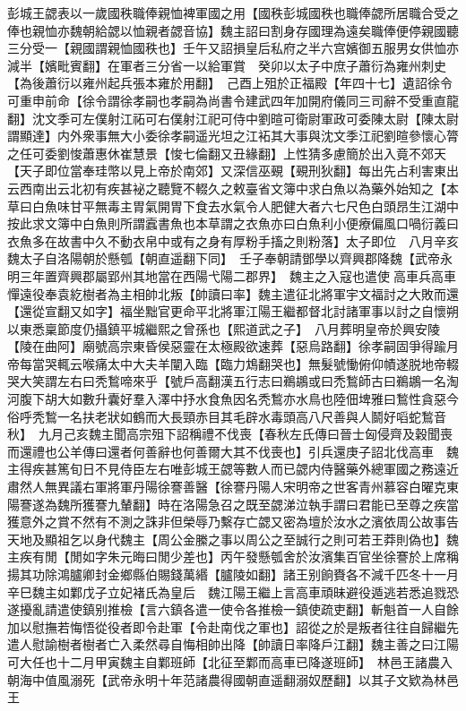 彭城王勰表以一歲國秩職俸親恤裨軍國之用【國秩彭城國秩也職俸勰所居職合受之俸也親恤亦魏朝給勰以恤親者勰音協】魏主詔曰割身存國理為遠矣職俸便停親國聽三分受一【親國謂親恤國秩也】壬午又詔損皇后私府之半六宫嬪御五服男女供恤亦減半【嬪毗賓翻】在軍者三分省一以給軍賞　癸卯以太子中庶子蕭衍為雍州刺史【為後蕭衍以雍州起兵張本雍於用翻】　己酉上殂於正福殿【年四十七】遺詔徐令可重申前命【徐令謂徐孝嗣也孝嗣為尚書令建武四年加開府儀同三司辭不受重直龍翻】沈文季可左僕射江祏可右僕射江祀可侍中劉暄可衛尉軍政可委陳太尉【陳太尉謂顯達】内外衆事無大小委徐孝嗣遥光坦之江袥其大事與沈文季江祀劉暄參懷心膂之任可委劉悛蕭惠休崔慧景【悛七倫翻又丑緣翻】上性猜多慮簡於出入竟不郊天【天子即位當奉珪幣以見上帝於南郊】又深信巫覡【覡刑狄翻】每出先占利害東出云西南出云北初有疾甚袐之聽覽不輟久之敕臺省文簿中求白魚以為藥外始知之【本草曰白魚味甘平無毒主胃氣開胃下食去水氣令人肥健大者六七尺色白頭昂生江湖中按此求文簿中白魚則所謂蠧書魚也本草謂之衣魚亦曰白魚利小便療偏風口喎衍義曰衣魚多在故書中久不動衣帛中或有之身有厚粉手搐之則粉落】太子即位　八月辛亥魏太子自洛陽朝於懸瓠【朝直遥翻下同】　壬子奉朝請鄧學以齊興郡降魏【武帝永明三年置齊興郡屬郢州其地當在西陽弋陽二郡界】　魏主之入寇也遣使高車兵高車憚遠役奉袁紇樹者為主相帥北叛【帥讀曰率】魏主遣征北將軍宇文福討之大敗而還【還從宣翻又如字】福坐黜官更命平北將軍江陽王繼都督北討諸軍事以討之自懷朔以東悉稟節度仍攝鎮平城繼熙之曾孫也【熙道武之子】　八月葬明皇帝於興安陵【陵在曲阿】廟號高宗東昏侯惡靈在太極殿欲速葬【惡烏路翻】徐孝嗣固爭得踰月帝每當哭輒云喉痛太中大夫羊闡入臨【臨力鴆翻哭也】無髮號慟俯仰幘遂脱地帝輟哭大笑謂左右曰秃鶖啼來乎【號戶高翻漢五行志曰鵜鶘或曰禿鶖師古曰鵜鶘一名淘河腹下胡大如數升囊好羣入澤中抒水食魚因名秃鶖亦水鳥也陸佃埤雅曰鶖性貪惡今俗呼秃鶖一名扶老狀如鶴而大長頸赤目其毛辟水毒頭高八尺善與人鬬好㗖蛇鶖音秋】　九月己亥魏主聞高宗殂下詔稱禮不伐喪【春秋左氏傳曰晉士匈侵齊及穀聞喪而還禮也公羊傳曰還者何善辭也何善爾大其不伐喪也】引兵還庚子詔北伐高車　魏主得疾甚篤旬日不見侍臣左右唯彭城王勰等數人而已勰内侍醫藥外總軍國之務遠近肅然人無異議右軍將軍丹陽徐謇善醫【徐謇丹陽人宋明帝之世客青州慕容白曜克東陽謇遂為魏所獲謇九輦翻】時在洛陽急召之既至勰涕泣執手謂曰君能已至尊之疾當獲意外之賞不然有不測之誅非但榮辱乃繫存亡勰又密為壇於汝水之濱依周公故事告天地及顯祖乞以身代魏主【周公金縢之事以周公之至誠行之則可若王莽則偽也】魏主疾有閒【閒如字朱元晦曰閒少差也】丙午發懸瓠舍於汝濱集百官坐徐謇於上席稱揚其功除鴻臚卿封金鄉縣伯賜錢萬緡【臚陵如翻】諸王别餉賚各不減千匹冬十一月辛巳魏主如鄴戊子立妃褚氏為皇后　魏江陽王繼上言高車頑昧避役遁逃若悉追戮恐遂擾亂請遣使鎮别推檢【言六鎮各遣一使令各推檢一鎮使疏吏翻】斬魁首一人自餘加以慰撫若悔悟從役者即令赴軍【令赴南伐之軍也】詔從之於是叛者往往自歸繼先遣人慰諭樹者樹者亡入柔然尋自悔相帥出降【帥讀日率降戶江翻】魏主善之曰江陽可大任也十二月甲寅魏主自鄴班師【北征至鄴而高車已降遂班師】　林邑王諸農入朝海中值風溺死【武帝永明十年范諸農得國朝直遥翻溺奴歷翻】以其子文欵為林邑王

